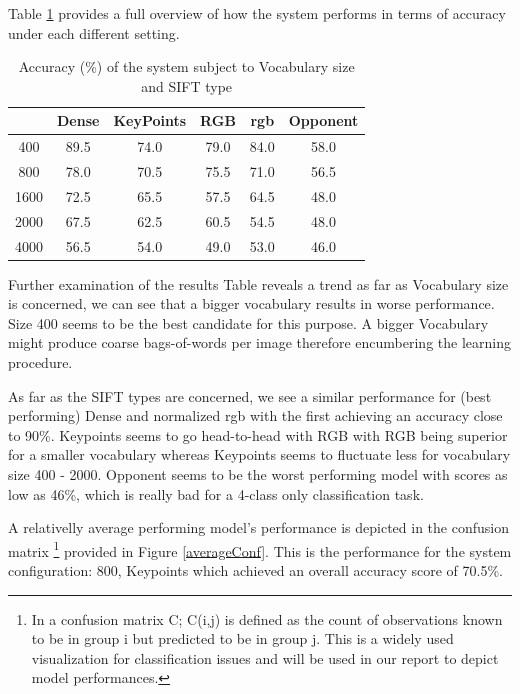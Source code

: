 \documentclass[11pt]{article}
\begin{document}
Table \ref{accuracies} provides a full overview of how the system performs in terms of accuracy under each different setting.

\begin{table}[h!]
    \centering
    \begin{tabular}{|c||ccccc|}
        \hline
             & Dense & KeyPoints & RGB  &   rgb    & Opponent \\
        \hline
        400  & 89.5  & 74.0      & 79.0 &   84.0   & 58.0 \\
        800  & 78.0  & 70.5      & 75.5 &   71.0   & 56.5 \\
        1600 & 72.5  & 65.5      & 57.5 &   64.5   & 48.0 \\
        2000 & 67.5  & 62.5      & 60.5 &   54.5   & 48.0 \\
        4000 & 56.5  & 54.0      & 49.0 &   53.0   & 46.0 \\
        \hline
    \end{tabular}
    \caption{Accuracy (\%) of the system subject to Vocabulary size and SIFT type}
\label{accuracies}
\end{table}

Further examination of the results Table reveals a trend as far as Vocabulary size is concerned, we can see that a bigger vocabulary results in worse performance. Size 400 seems to be the best candidate for this purpose. A bigger Vocabulary might produce coarse bags-of-words per image therefore encumbering the learning procedure.

As far as the SIFT types are concerned, we see a similar performance for (best performing) Dense and normalized rgb with the first achieving an accuracy close to 90\%. Keypoints seems to go head-to-head with RGB with RGB being superior for a smaller vocabulary whereas Keypoints seems to fluctuate less for vocabulary size 400 - 2000. Opponent seems to be the worst performing model with scores as low as 46\%, which is really bad for a 4-class only classification task.

A relativelly average performing model's performance is depicted in the confusion matrix \footnote{In a confusion matrix C; C(i,j) is defined as the count of observations known to be in group i but predicted to be in group j. This is a widely used visualization for classification issues and will be used in our report to depict model performances.} provided in Figure \ref{averageConf}. This is the performance for the system configuration: 800, Keypoints which achieved an overall accuracy score of 70.5\%.
\end{document}
